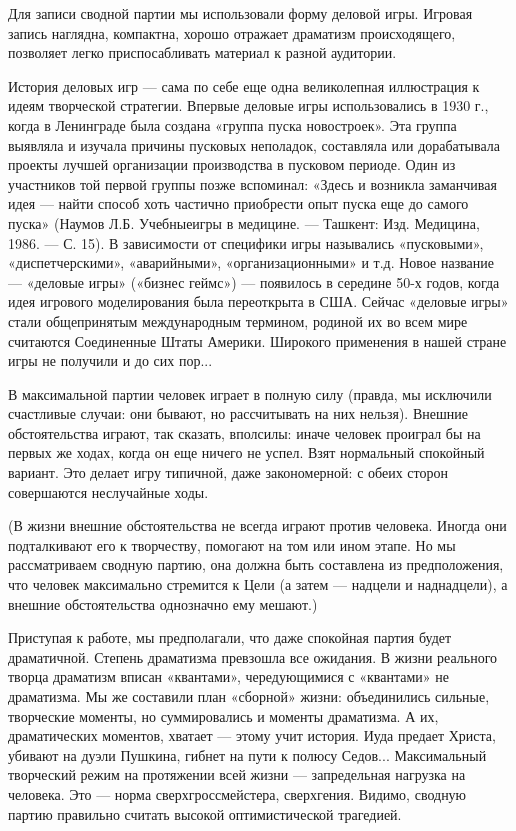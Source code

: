 Для записи сводной партии мы  использовали форму деловой игры. Игровая
запись наглядна,  компактна, хорошо отражает  драматизм происходящего,
позволяет легко приспосабливать материал к разной аудитории.

История деловых игр — сама по себе еще одна великолепная иллюстрация к
идеям творческой стратегии. Впервые деловые игры использовались в 1930
г., когда  в Ленинграде  была создана  «группа пуска  новостроек». Эта
группа  выявляла  и  изучала причины  пусковых  неполадок,  составляла
или дорабатывала  проекты лучшей  организации производства  в пусковом
периоде.  Один  из  участников  той  первой  группы  позже  вспоминал:
«Здесь  и  возникла  заманчивая  идея —  найти  способ  хоть  частично
приобрести опыт пуска еще до  самого пуска» (Наумов Л.Б. Учебныеигры в
медицине. — Ташкент:  Изд. Медицина, 1986. — С. 15).  В зависимости от
специфики игры назывались «пусковыми», «диспетчерскими», «аварийными»,
«организационными»  и т.д.  Новое название  — «деловые  игры» («бизнес
геймс»)  —  появилось  в  середине 50-х  годов,  когда  идея  игрового
моделирования  была переоткрыта  в  США. Сейчас  «деловые игры»  стали
общепринятым международным термином, родиной их во всем мире считаются
Соединенные Штаты Америки. Широкого применения  в нашей стране игры не
получили и до сих пор...


В  максимальной  партии  человек  играет в  полную  силу  (правда,  мы
исключили  счастливые  случаи:  они  бывают, но  рассчитывать  на  них
нельзя). Внешние  обстоятельства играют, так сказать,  вполсилы: иначе
человек проиграл бы на первых же  ходах, когда он еще ничего не успел.
Взят  нормальный спокойный  вариант.  Это делает  игру типичной,  даже
закономерной: с обеих сторон совершаются неслучайные ходы.

(В  жизни внешние  обстоятельства  не всегда  играют против  человека.
Иногда они  подталкивают его  к творчеству, помогают  на том  или ином
этапе. Но мы рассматриваем сводную  партию, она должна быть составлена
из предположения,  что человек максимально  стремится к Цели  (а затем
—  надцели  и наднадцели),  а  внешние  обстоятельства однозначно  ему
мешают.)


Приступая  к  работе,  мы  предполагали,  что  даже  спокойная  партия
будет  драматичной.  Степень  драматизма  превзошла  все  ожидания.  В
жизни реального  творца драматизм  вписан «квантами»,  чередующимися с
«квантами»  не  драматизма.  Мы  же составили  план  «сборной»  жизни:
объединились сильные,  творческие моменты, но суммировались  и моменты
драматизма.  А  их,  драматических  моментов,  хватает  —  этому  учит
история.  Иуда предает  Христа, убивают  на дуэли  Пушкина, гибнет  на
пути  к полюсу  Седов... Максимальный  творческий режим  на протяжении
всей  жизни  —   запредельная  нагрузка  на  человека.   Это  —  норма
сверхгроссмейстера,  сверхгения.  Видимо,   сводную  партию  правильно
считать высокой оптимистической трагедией.


